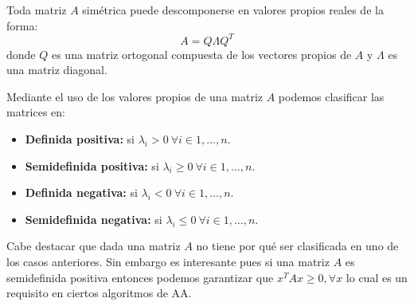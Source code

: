 \begin{proposition}
    Toda matriz $A$ simétrica puede descomponerse en valores propios reales de la forma:
    \begin{equation}
        A = Q \Lambda Q^T
    \end{equation}
    donde $Q$ es una matriz ortogonal compuesta de los vectores propios de $A$ y $\Lambda$ es una matriz diagonal.
\end{proposition}

Mediante el uso de los valores propios de una matriz $A$ podemos clasificar las matrices en:
\begin{itemize}
    \item \textbf{Definida positiva:} si $\lambda_i > 0\ \forall i \in {1, \ldots, n}$.
    \item \textbf{Semidefinida positiva:} si $\lambda_i \ge 0\ \forall i \in {1, \ldots, n}$.
    \item \textbf{Definida negativa:} si $\lambda_i < 0\ \forall i \in {1, \ldots, n}$.
    \item \textbf{Semidefinida negativa:} si $\lambda_i \le 0\ \forall i \in {1, \ldots, n}$.
\end{itemize}

Cabe destacar que dada una matriz $A$ no tiene por qué ser clasificada en uno de los casos anteriores. Sin embargo es interesante pues si una matriz $A$ es semidefinida positiva entonces podemos garantizar que $x^TAx \ge 0, \forall x$ lo cual es un requisito en ciertos algoritmos de \ac{AA}.
